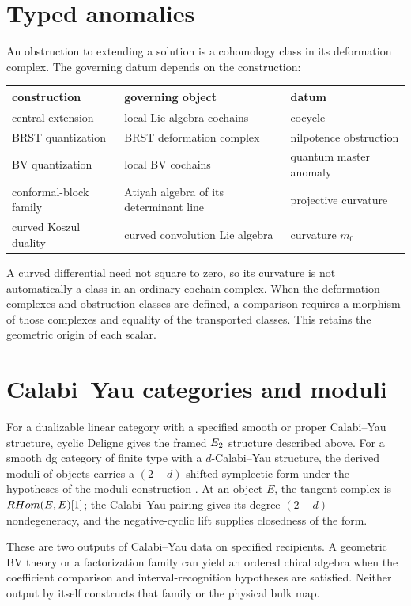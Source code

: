 \section{Typed anomalies}
An obstruction to extending a solution is a cohomology class in its
deformation complex. The governing datum depends on the construction:
\begin{center}
\begin{tabularx}{\textwidth}{@{}>{\raggedright\arraybackslash}p{}>{\raggedright\arraybackslash}X>{\raggedright\arraybackslash}p{}@{}}
\toprule
construction&governing object&datum\\ \midrule
central extension&local Lie algebra cochains&cocycle\\
BRST quantization&BRST deformation complex&nilpotence obstruction\\
BV quantization&local BV cochains&quantum master anomaly\\
conformal-block family&Atiyah algebra of its determinant line&projective curvature\\
curved Koszul duality&curved convolution Lie algebra&curvature $m_0$\\
\bottomrule
\end{tabularx}
\end{center}
A curved differential need not square to zero, so its curvature is not
automatically a class in an ordinary cochain complex. When the deformation
complexes and obstruction classes are defined, a comparison requires a
morphism of those complexes and equality of the transported classes.
This retains the geometric origin of each scalar.


\section{Calabi--Yau categories and moduli}
For a dualizable linear category with a specified smooth or proper Calabi--Yau
structure, cyclic Deligne gives the framed $E_2$ structure described above.
For a smooth dg category of finite type with a $d$-Calabi--Yau structure,
the derived moduli of objects carries a $(2-d)$-shifted symplectic form
under the hypotheses of the moduli construction \cite{PTVV,BravDyckerhoff}.
At an object $E$, the tangent complex is $RHom(E,E)[1]$; the Calabi--Yau
pairing gives its degree-$(2-d)$ nondegeneracy, and the negative-cyclic lift
supplies closedness of the form.

These are two outputs of Calabi--Yau data on specified recipients.
A geometric BV theory or a factorization family can yield an ordered chiral
algebra when the coefficient comparison and interval-recognition hypotheses
are satisfied. Neither output by itself constructs that family or the physical bulk map.

